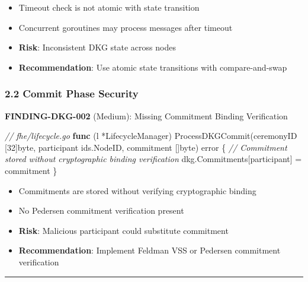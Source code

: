 \documentclass[
]{article}
\newenvironment{Shaded}{}{}
\newcommand{\CommentTok}[1]{\textcolor[rgb]{0.38,0.63,0.69}{\textit{#1}}}
\newcommand{\DataTypeTok}[1]{\textcolor[rgb]{0.56,0.13,0.00}{#1}}
\newcommand{\DecValTok}[1]{\textcolor[rgb]{0.25,0.63,0.44}{#1}}
\newcommand{\KeywordTok}[1]{\textcolor[rgb]{0.00,0.44,0.13}{\textbf{#1}}}
\newcommand{\NormalTok}[1]{#1}
\newcommand{\OperatorTok}[1]{\textcolor[rgb]{0.40,0.40,0.40}{#1}}
\providecommand{\tightlist}{%
  \setlength{\itemsep}{0pt}\setlength{\parskip}{0pt}}
\begin{document}
\begin{itemize}
\tightlist
\item
  Timeout check is not atomic with state transition
\item
  Concurrent goroutines may process messages after timeout
\item
  \textbf{Risk}: Inconsistent DKG state across nodes
\item
  \textbf{Recommendation}: Use atomic state transitions with
  compare-and-swap
\end{itemize}

\subsubsection{2.2 Commit Phase
Security}\label{22-commit-phase-security}

\textbf{FINDING-DKG-002} (Medium): Missing Commitment Binding
Verification

\begin{Shaded}
\begin{Highlighting}[]
\CommentTok{// fhe/lifecycle.go}
\KeywordTok{func} \OperatorTok{(}\NormalTok{l }\OperatorTok{*}\NormalTok{LifecycleManager}\OperatorTok{)}\NormalTok{ ProcessDKGCommit}\OperatorTok{(}\NormalTok{ceremonyID }\OperatorTok{[}\DecValTok{32}\OperatorTok{]}\DataTypeTok{byte}\OperatorTok{,}
\NormalTok{    participant ids}\OperatorTok{.}\NormalTok{NodeID}\OperatorTok{,}\NormalTok{ commitment }\OperatorTok{[]}\DataTypeTok{byte}\OperatorTok{)} \DataTypeTok{error} \OperatorTok{\{}
    \CommentTok{// Commitment stored without cryptographic binding verification}
\NormalTok{    dkg}\OperatorTok{.}\NormalTok{Commitments}\OperatorTok{[}\NormalTok{participant}\OperatorTok{]} \OperatorTok{=}\NormalTok{ commitment}
\OperatorTok{\}}
\end{Highlighting}
\end{Shaded}

\begin{itemize}
\tightlist
\item
  Commitments are stored without verifying cryptographic binding
\item
  No Pedersen commitment verification present
\item
  \textbf{Risk}: Malicious participant could substitute commitment
\item
  \textbf{Recommendation}: Implement Feldman VSS or Pedersen commitment
  verification
\end{itemize}

\begin{center}\rule{0.5\linewidth}{0.5pt}\end{center}
\end{document}
